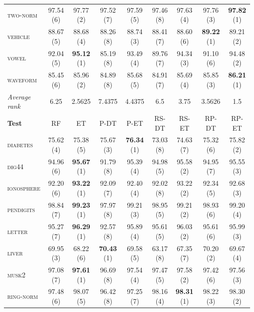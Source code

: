 \begin{table}
\begin{tabular}{|l|cccccccc|}
    \textsc{two-norm  }  & 97.54 (6)    & 97.77 (2)    & 97.52 (7)    & 97.59 (5)    & 97.46 (8)    & 97.63 (4)    & 97.76 (3)   &  \textbf{97.82} (1) \\
    \textsc{vehicle   }  & 88.67 (5)    & 88.68 (4)    & 88.26 (8)    & 88.74 (3)    & 88.41 (7)    & 88.60 (6)    & \textbf{89.22} (1)   &  89.21 (2) \\
    \textsc{vowel     }  & 92.04 (5)    & \textbf{95.12} (1)    & 85.19 (8)    & 93.49 (4)    & 89.76 (7)    & 94.34 (3)    & 91.10 (6)   &  94.48 (2) \\
    \textsc{waveform  }  & 85.45 (6)    & 85.96 (2)    & 84.89 (8)    & 85.68 (5)    & 84.91 (7)    & 85.69 (4)    & 85.85 (3)   &  \textbf{86.21} (1) \\
\hline
\textit{Average rank} & 6.25 & 2.5625 & 7.4375 & 4.4375 & 6.5 & 3.75 & 3.5626 & 1.5 \\
\hline
\hline
\textbf{Test} & RF & ET & P-DT & P-ET & RS-DT & RS-ET & RP-DT & RP-ET \\
\hline
\hline
    \textsc{diabetes  }  & 75.62 (4)    & 75.38 (5)    & 75.67 (3)    & \textbf{76.34} (1)    & 73.03 (8)    & 74.63 (7)    & 75.32 (6)   &  75.82 (2) \\
    \textsc{dig44     }  & 94.96 (6)    & \textbf{95.67} (1)    & 91.79 (8)    & 95.39 (4)    & 94.98 (5)    & 95.58 (2)    & 94.95 (7)   &  95.55 (3) \\
    \textsc{ionosphere}  & 92.20 (6)    & \textbf{93.22} (1)    & 92.09 (7)    & 92.40 (4)    & 92.02 (8)    & 93.22 (2)    & 92.34 (5)   &  92.68 (3) \\
    \textsc{pendigits }  & 98.84 (7)    & \textbf{99.23} (1)    & 97.97 (8)    & 99.21 (3)    & 98.95 (5)    & 99.21 (2)    & 98.93 (6)   &  99.20 (4) \\
    \textsc{letter    }  & 95.27 (7)    & \textbf{96.29} (1)    & 92.57 (8)    & 95.89 (4)    & 95.61 (5)    & 96.03 (2)    & 95.61 (6)   &  95.99 (3) \\
    \textsc{liver     }  & 69.95 (3)    & 68.22 (6)    & \textbf{70.43} (1)    & 69.58 (5)    & 63.17 (8)    & 67.35 (7)    & 70.20 (2)   &  69.67 (4) \\
    \textsc{musk2     }  & 97.08 (7)    & \textbf{97.61} (1)    & 96.69 (8)    & 97.54 (4)    & 97.47 (5)    & 97.58 (2)    & 97.42 (6)   &  97.56 (3) \\
    \textsc{ring-norm }  & 97.48 (6)    & 98.07 (5)    & 96.42 (8)    & 97.25 (7)    & 98.16 (4)    & \textbf{98.31} (1)    & 98.22 (3)   &  98.30 (2) \\

\end{tabular}
\end{table}
